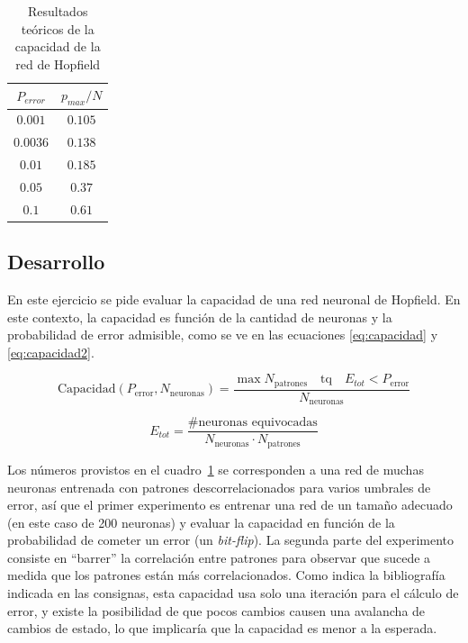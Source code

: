 \documentclass[11pt]{article} %
\begin{document}
\begin{table}[h!]
\centering
\begin{tabular}{|c|c|}
\hline
$P_{error}$ & $p_{max}/N$ \\ \hline
$0.001$     & $0.105$     \\ \hline
$0.0036$    & $0.138$     \\ \hline
$0.01$      & $0.185$     \\ \hline
$0.05$      & $0.37$      \\ \hline
$0.1$       & $0.61$      \\ \hline
\end{tabular}
\caption{Resultados teóricos de la capacidad de la red de Hopfield}
\label{tab:1}
\end{table}


\subsection{Desarrollo}

En este ejercicio se pide evaluar la capacidad de una red neuronal de Hopfield. En este contexto, la capacidad es función de la cantidad de neuronas y la probabilidad de error admisible, como se ve en las ecuaciones \eqref{eq:capacidad} y \eqref{eq:capacidad2}. 

\begin{equation}
\text{Capacidad}(P_{\text{error}} , N_{\text{neuronas}}) = \frac{\max N_{\text{patrones}} \quad \text{tq} \quad E_{tot}<P_{\text{error}}}{N_{\text{neuronas}}}
\label{eq:capacidad}
\end{equation}

\begin{equation}
E_{tot} = \frac{\text{\# neuronas equivocadas}}{N_{\text{neuronas}} \cdot N_{\text{patrones}}}
\label{eq:capacidad2}
\end{equation}

Los números provistos en el  cuadro~\ref{tab:1} se corresponden a una red de muchas neuronas entrenada con patrones descorrelacionados para varios umbrales de error, así que el primer experimento es entrenar una red de un tamaño adecuado (en este caso de 200 neuronas) y evaluar la capacidad en función de la probabilidad de cometer un error (un \textit{bit-flip}). La segunda parte del experimento consiste en ``barrer'' la correlación entre patrones para observar que sucede a medida que los patrones están más correlacionados. Como indica la bibliografía indicada en las consignas, esta capacidad usa solo una iteración para el cálculo de error, y existe la posibilidad de que pocos cambios causen una avalancha de cambios de estado, lo que implicaría que la capacidad es menor a la esperada. 
\end{document}
